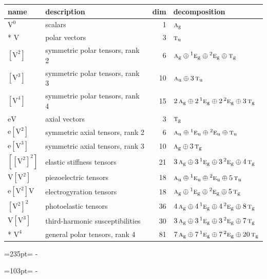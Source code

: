 \documentclass[10pt,a4paper]{article}
\newcommand{\needspace}[1]{\par\penalty-100\begingroup\dimen0=#1\relax\dimen2=\pagegoal
  \advance\dimen2-\pagetotal\ifdim\dimen0>\dimen2\relax\ifdim\dimen2>0pt\vfil\break\fi\fi
  \endgroup}
\numberwithin{equation}{section}
\newcommand{\irr}[1]{\text{\normalfont\scshape #1}}
\newcommand{\conjpair}[1]{{}^{#1}}
\newcommand{\ptag}[1]{\mathrm{#1}}
\newcommand{\jahn}[1]{\mathrm{#1}}
\newlength{\fillwidth}\newlength{\cellwidth}\newlength{\colwidth}
\begin{document}
{\begin{longtable}{@{}llr>{\RaggedRight\arraybackslash}p{\fillwidth}@{}}
name & description & dim & decomposition\\\midrule\endhead
\bottomrule\endfoot\endlastfoot
$\jahn{V^{0}}$ & scalars & 1 & $\irr{a}_{\ptag{g}}$\\*
$\jahn{V}$ & polar vectors & 3 & $\irr{t}_{\ptag{u}}$\\
$\jahn{[V^{2}]}$ & symmetric polar tensors, rank 2 & 6 & $\irr{a}_{\ptag{g}} \oplus\allowbreak \conjpair{1}\irr{e}_{\ptag{g}} \oplus\allowbreak \conjpair{2}\irr{e}_{\ptag{g}} \oplus\allowbreak \irr{t}_{\ptag{g}}$\\
$\jahn{[V^{3}]}$ & symmetric polar tensors, rank 3 & 10 & $\irr{a}_{\ptag{u}} \oplus\allowbreak 3\,\irr{t}_{\ptag{u}}$\\
$\jahn{[V^{4}]}$ & symmetric polar tensors, rank 4 & 15 & $2\,\irr{a}_{\ptag{g}} \oplus\allowbreak 2\,\conjpair{1}\irr{e}_{\ptag{g}} \oplus\allowbreak 2\,\conjpair{2}\irr{e}_{\ptag{g}} \oplus\allowbreak 3\,\irr{t}_{\ptag{g}}$\\
$\jahn{eV}$ & axial vectors & 3 & $\irr{t}_{\ptag{g}}$\\
$\jahn{e[V^{2}]}$ & symmetric axial tensors, rank 2 & 6 & $\irr{a}_{\ptag{u}} \oplus\allowbreak \conjpair{1}\irr{e}_{\ptag{u}} \oplus\allowbreak \conjpair{2}\irr{e}_{\ptag{u}} \oplus\allowbreak \irr{t}_{\ptag{u}}$\\
$\jahn{e[V^{3}]}$ & symmetric axial tensors, rank 3 & 10 & $\irr{a}_{\ptag{g}} \oplus\allowbreak 3\,\irr{t}_{\ptag{g}}$\\
$\jahn{[[V^{2}]^{2}]}$ & elastic stiffness tensors & 21 & $3\,\irr{a}_{\ptag{g}} \oplus\allowbreak 3\,\conjpair{1}\irr{e}_{\ptag{g}} \oplus\allowbreak 3\,\conjpair{2}\irr{e}_{\ptag{g}} \oplus\allowbreak 4\,\irr{t}_{\ptag{g}}$\\
$\jahn{V[V^{2}]}$ & piezoelectric tensors & 18 & $\irr{a}_{\ptag{u}} \oplus\allowbreak \conjpair{1}\irr{e}_{\ptag{u}} \oplus\allowbreak \conjpair{2}\irr{e}_{\ptag{u}} \oplus\allowbreak 5\,\irr{t}_{\ptag{u}}$\\
$\jahn{e[V^{2}]V}$ & electrogyration tensors & 18 & $\irr{a}_{\ptag{g}} \oplus\allowbreak \conjpair{1}\irr{e}_{\ptag{g}} \oplus\allowbreak \conjpair{2}\irr{e}_{\ptag{g}} \oplus\allowbreak 5\,\irr{t}_{\ptag{g}}$\\
$\jahn{[V^{2}]^{2}}$ & photoelastic tensors & 36 & $4\,\irr{a}_{\ptag{g}} \oplus\allowbreak 4\,\conjpair{1}\irr{e}_{\ptag{g}} \oplus\allowbreak 4\,\conjpair{2}\irr{e}_{\ptag{g}} \oplus\allowbreak 8\,\irr{t}_{\ptag{g}}$\\
$\jahn{V[V^{3}]}$ & third-harmonic susceptibilities & 30 & $3\,\irr{a}_{\ptag{g}} \oplus\allowbreak 3\,\conjpair{1}\irr{e}_{\ptag{g}} \oplus\allowbreak 3\,\conjpair{2}\irr{e}_{\ptag{g}} \oplus\allowbreak 7\,\irr{t}_{\ptag{g}}$\\*
$\jahn{V^{4}}$ & general polar tensors, rank 4 & 81 & $7\,\irr{a}_{\ptag{g}} \oplus\allowbreak 7\,\conjpair{1}\irr{e}_{\ptag{g}} \oplus\allowbreak 7\,\conjpair{2}\irr{e}_{\ptag{g}} \oplus\allowbreak 20\,\irr{t}_{\ptag{g}}$\\
\bottomrule\end{longtable}}
\needspace{235pt}
\needspace{103pt}
\end{document}
